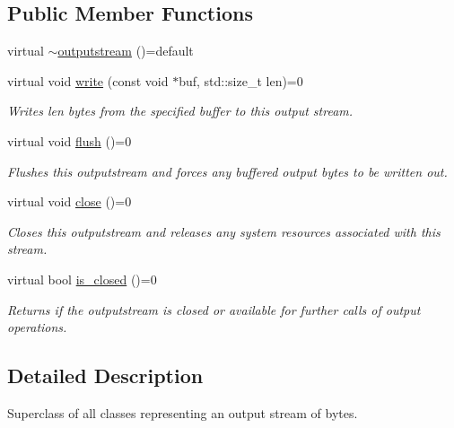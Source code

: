 \subsection*{Public Member Functions}
\begin{DoxyCompactItemize}
\item 
virtual \hyperlink{structdevfix_1_1base_1_1io_1_1outputstream_a9154a8859d44c7929c98fb83e03047e3}{$\sim$outputstream} ()=default
\item 
virtual void \hyperlink{structdevfix_1_1base_1_1io_1_1outputstream_ac7e5fcd6883c7c8f53356a4eb8284c00}{write} (const void $\ast$buf, std\+::size\+\_\+t len)=0
\begin{DoxyCompactList}\small\item\em Writes len bytes from the specified buffer to this output stream. \end{DoxyCompactList}\item 
virtual void \hyperlink{structdevfix_1_1base_1_1io_1_1outputstream_a3fe3b34675a2d70331e6ca235388e0cc}{flush} ()=0
\begin{DoxyCompactList}\small\item\em Flushes this {\itshape outputstream} and forces any buffered output bytes to be written out. \end{DoxyCompactList}\item 
virtual void \hyperlink{structdevfix_1_1base_1_1io_1_1outputstream_a060c2e7040e6bb831b8150f64bd8abf7}{close} ()=0
\begin{DoxyCompactList}\small\item\em Closes this {\itshape outputstream} and releases any system resources associated with this stream. \end{DoxyCompactList}\item 
virtual bool \hyperlink{structdevfix_1_1base_1_1io_1_1outputstream_a52bd2eac8f6fbc496eab5138a48d2f06}{is\+\_\+closed} ()=0
\begin{DoxyCompactList}\small\item\em Returns if the {\itshape outputstream} is closed or available for further calls of output operations. \end{DoxyCompactList}\end{DoxyCompactItemize}


\subsection{Detailed Description}
Superclass of all classes representing an output stream of bytes. 

